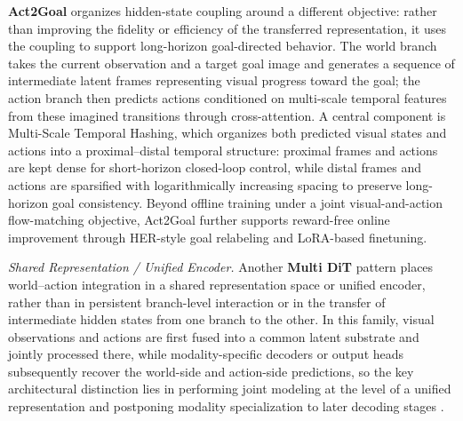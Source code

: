 \textbf{Act2Goal} \cite{Act2Goal} organizes hidden-state coupling around a different objective: rather than improving the fidelity or efficiency of the transferred representation, it uses the coupling to support long-horizon goal-directed behavior. The world branch takes the current observation and a target goal image and generates a sequence of intermediate latent frames representing visual progress toward the goal; the action branch then predicts actions conditioned on multi-scale temporal features from these imagined transitions through cross-attention. A central component is Multi-Scale Temporal Hashing, which organizes both predicted visual states and actions into a proximal–distal temporal structure: proximal frames and actions are kept dense for short-horizon closed-loop control, while distal frames and actions are sparsified with logarithmically increasing spacing to preserve long-horizon goal consistency. Beyond offline training under a joint visual-and-action flow-matching objective, Act2Goal further supports reward-free online improvement through HER-style goal relabeling and LoRA-based finetuning.




\textcolor{openmossblue}{\textit{Shared Representation / Unified Encoder.}} Another \textbf{Multi DiT} pattern places world--action integration in a shared representation space or unified encoder, rather than in persistent branch-level interaction or in the transfer of intermediate hidden states from one branch to the other. In this family, visual observations and actions are first fused into a common latent substrate and jointly processed there, while modality-specific decoders or output heads subsequently recover the world-side and action-side predictions, so the key architectural distinction lies in performing joint modeling at the level of a unified representation and postponing modality specialization to later decoding stages \cite{UVA,PhysGen}.


